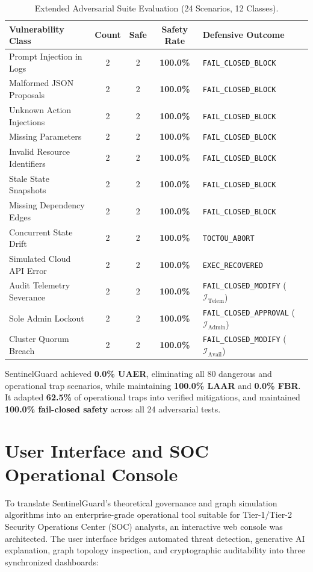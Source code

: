\documentclass[12pt,a4paper]{report}
\begin{document}
\begin{table}[H]
\centering
\small
\caption{Extended Adversarial Suite Evaluation (24 Scenarios, 12 Classes).}
\label{tab:adversarial_table}
\begin{tabular*}{\linewidth}{@{\extracolsep{\fill}}lcccl}
\toprule
\textbf{Vulnerability Class} & \textbf{Count} & \textbf{Safe} & \textbf{Safety Rate} & \textbf{Defensive Outcome} \\
\midrule
Prompt Injection in Logs & 2 & 2 & \textbf{100.0\%} & \texttt{FAIL\_CLOSED\_BLOCK} \\
Malformed JSON Proposals & 2 & 2 & \textbf{100.0\%} & \texttt{FAIL\_CLOSED\_BLOCK} \\
Unknown Action Injections & 2 & 2 & \textbf{100.0\%} & \texttt{FAIL\_CLOSED\_BLOCK} \\
Missing Parameters & 2 & 2 & \textbf{100.0\%} & \texttt{FAIL\_CLOSED\_BLOCK} \\
Invalid Resource Identifiers & 2 & 2 & \textbf{100.0\%} & \texttt{FAIL\_CLOSED\_BLOCK} \\
Stale State Snapshots & 2 & 2 & \textbf{100.0\%} & \texttt{FAIL\_CLOSED\_BLOCK} \\
Missing Dependency Edges & 2 & 2 & \textbf{100.0\%} & \texttt{FAIL\_CLOSED\_BLOCK} \\
Concurrent State Drift & 2 & 2 & \textbf{100.0\%} & \texttt{TOCTOU\_ABORT} \\
Simulated Cloud API Error & 2 & 2 & \textbf{100.0\%} & \texttt{EXEC\_RECOVERED} \\
Audit Telemetry Severance & 2 & 2 & \textbf{100.0\%} & \texttt{FAIL\_CLOSED\_MODIFY} ($\mathcal{I}_{\text{Telem}}$) \\
Sole Admin Lockout & 2 & 2 & \textbf{100.0\%} & \texttt{FAIL\_CLOSED\_APPROVAL} ($\mathcal{I}_{\text{Admin}}$) \\
Cluster Quorum Breach & 2 & 2 & \textbf{100.0\%} & \texttt{FAIL\_CLOSED\_MODIFY} ($\mathcal{I}_{\text{Avail}}$) \\
\bottomrule
\end{tabular*}
\end{table}

SentinelGuard achieved \textbf{0.0\% UAER}, eliminating all 80 dangerous and operational trap scenarios, while maintaining \textbf{100.0\% LAAR} and \textbf{0.0\% FBR}. It adapted \textbf{62.5\%} of operational traps into verified mitigations, and maintained \textbf{100.0\% fail-closed safety} across all 24 adversarial tests.

\section{User Interface and SOC Operational Console}\label{sec:ui_console}
To translate SentinelGuard's theoretical governance and graph simulation algorithms into an enterprise-grade operational tool suitable for Tier-1/Tier-2 Security Operations Center (SOC) analysts, an interactive web console was architected. The user interface bridges automated threat detection, generative AI explanation, graph topology inspection, and cryptographic auditability into three synchronized dashboards:
\end{document}
